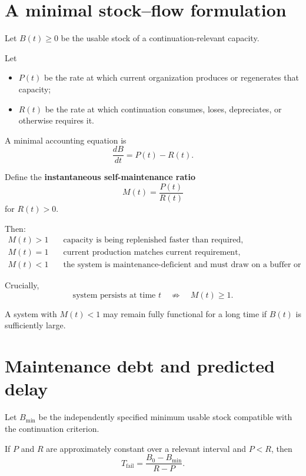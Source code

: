 \documentclass[11pt,a4paper]{article}
\begin{document}
\section{A minimal stock--flow formulation}

Let $B(t)\ge0$ be the usable stock of a continuation-relevant capacity.

Let
\begin{itemize}[nosep]
    \item $P(t)$ be the rate at which current organization produces or regenerates that capacity;
    \item $R(t)$ be the rate at which continuation consumes, loses, depreciates, or otherwise requires it.
\end{itemize}

A minimal accounting equation is
\begin{equation}
\frac{dB}{dt}=P(t)-R(t).
\label{eq:buffer}
\end{equation}

Define the \textbf{instantaneous self-maintenance ratio}
\begin{equation}
\boxed{
M(t)=\frac{P(t)}{R(t)}
}
\label{eq:maintenance-ratio}
\end{equation}
for $R(t)>0$.

Then:
\begin{align*}
M(t)>1 &\quad \text{capacity is being replenished faster than required},\\
M(t)=1 &\quad \text{current production matches current requirement},\\
M(t)<1 &\quad \text{the system is maintenance-deficient and must draw on a buffer or external support.}
\end{align*}

Crucially,
\[
\text{system persists at time }t
\quad\not\Rightarrow\quad
M(t)\ge1.
\]

A system with $M(t)<1$ may remain fully functional for a long time if $B(t)$ is sufficiently large.

\section{Maintenance debt and predicted delay}

Let $B_{\min}$ be the independently specified minimum usable stock compatible with the continuation criterion.

If $P$ and $R$ are approximately constant over a relevant interval and $P<R$, then
\begin{equation}
\boxed{
T_{\mathrm{fail}}
=
\frac{B_0-B_{\min}}{R-P}.
}
\label{eq:failure-time}
\end{equation}
\end{document}
